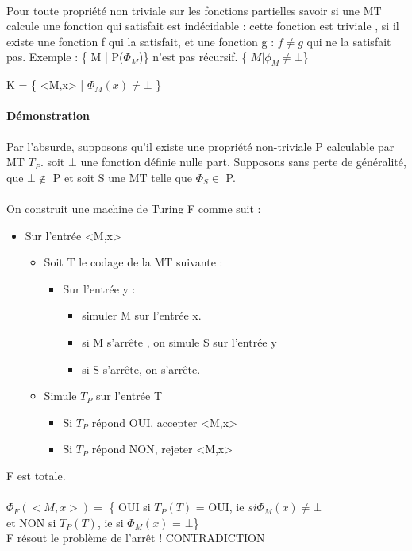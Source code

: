 \documentclass{article}
\begin{document}
{{\paragraph{}
\begin{center}
\date{5 Février 2013}
\end{center}
Pour toute propriété non triviale sur les fonctions partielles savoir si une MT calcule une fonction qui satisfait est indécidable : cette fonction est triviale , si il existe une fonction f qui la satisfait, et une fonction g : $f \neq g$ qui ne la satisfait pas. Exemple :
\{ M | P($\Phi_{M}$)\} n'est pas récursif. \{ $ M | \phi_{M} \neq \bot$\}\\
\begin{center}
 K = \{ <M,x> | $\Phi_{M}(x) \neq \bot$ \}
\end{center}  
\paragraph{Démonstration} Par l'absurde, supposons qu'il existe une propriété non-triviale P calculable par MT $T_{P}$. soit $\bot$ une fonction définie nulle part. Supposons sans perte de généralité, que $\bot \notin$ P et soit S une MT telle que $\Phi_{S} \in$ P.\\\\On construit une machine de Turing F comme suit :
\begin{itemize}
\item Sur l'entrée <M,x>
\begin{itemize}
\item Soit T le codage de la MT suivante : 
\begin{itemize}
\item Sur l'entrée y : 
\begin{itemize}
\item simuler M sur l'entrée x.
\item si M s’arrête , on simule S sur l'entrée y
\item si S s’arrête, on s’arrête.
\end{itemize}
\end{itemize}
\item Simule $T_{P}$ sur l'entrée T
\begin{itemize}
\item Si $T_{P}$ répond OUI, accepter <M,x>
\item Si $T_{P}$ répond NON, rejeter <M,x>
\end{itemize}
\end{itemize}
\end{itemize}
F est totale.\\\\
$\Phi_{F}(<M,x>) =$ \{ OUI si $T_{P}(T)$ = OUI, ie $si \Phi_{M}(x) \neq \bot$ \\ et NON si $T_{P}(T)$, ie si $\Phi_{M}(x)$ = $\bot$\}\\F résout le problème de l’arrêt ! CONTRADICTION\\\\

}}
\end{document}

